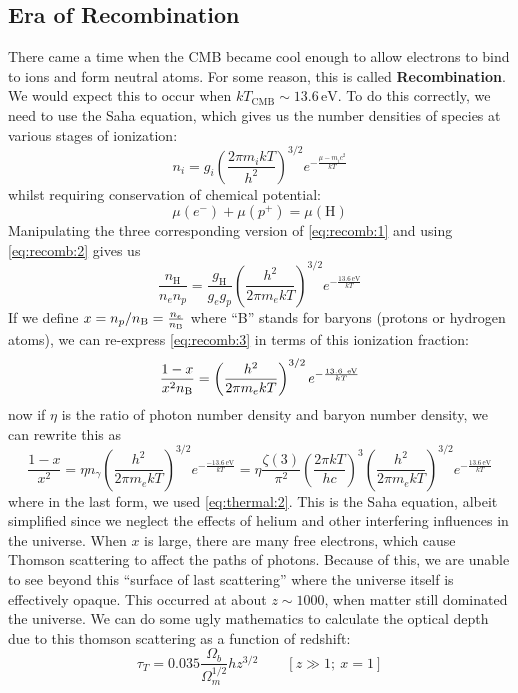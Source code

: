 \documentclass[10pt]{article}
\numberwithin{equation}{section}
\begin{document}
\subsection{Era of Recombination} %
\label{sub:era_of_recombination}
	There came a time when the CMB became cool enough to allow electrons to bind to ions and form neutral atoms. For some reason, this is called \textbf{Recombination}. We would expect this to occur when $kT_{\mathrm{CMB}}\sim 13.6\,\mathrm{eV}$. To do this correctly, we need to use the Saha equation, which gives us the number densities of species at various stages of ionization:
	\begin{equation}
		\label{eq:recomb:1} n_i = g_i \left(\frac{2\pi m_i kT}{h^2}\right)^{3/2}e^{-\frac{\mu -m_i c^2}{kT}}
	\end{equation}
	whilst requiring conservation of chemical potential:
	\begin{equation}
		\label{eq:recomb:2} \mu(e^-) + \mu(p^+) = \mu(\mathrm{H})
	\end{equation}
	Manipulating the three corresponding version of \eqref{eq:recomb:1} and using \eqref{eq:recomb:2} gives us
	\begin{equation}
		\label{eq:recomb:3} \frac{n_{\mathrm{H}}}{n_{e}n_p} = \frac{g_\mathrm{H}}{g_eg_p} \left(\frac{h^2}{2\pi m_ekT}\right)^{3/2} e^{-\frac{13.6\,\mathrm{eV}}{kT}}
	\end{equation}
	If we define $x=n_p/n_{\mathrm{\rm B}} = \frac{n_e}{n_{\rm B}}$ where ``B'' stands for baryons (protons or hydrogen atoms), we can re-express \eqref{eq:recomb:3} in terms of this ionization fraction:
	\begin{equation}
		\label{eq:recomb:4} \frac{1-x}{x^2n_{\rm B}} = \left(\frac{h^2}{2\pi m_e kT}\right)^{3/2}e^{-\frac{13.6\ \mathrm{eV}}{kT}}
	\end{equation}
	now if $\eta$ is the ratio of photon number density and baryon number density, we can rewrite this as
	\begin{equation}
		\label{eq:recomb:5} \frac{1-x}{x^2} = \eta n_\gamma\left(\frac{h^2}{2\pi m_e kT}\right)^{3/2} e^{-\frac{-13.6\,\mathrm{eV}}{kT}} = \eta\frac{\zeta(3)}{\pi^2}\left(\frac{2\pi k T}{hc}\right)^3 \left( \frac{h^2}{2\pi m_e kT}\right)^{3/2} e^{-\frac{13.6\,\mathrm{eV}}{kT}}
	\end{equation}
	where in the last form, we used \eqref{eq:thermal:2}. This is the Saha equation, albeit simplified since we neglect the effects of helium and other interfering influences in the universe. When $x$ is large, there are many free electrons, which cause Thomson scattering to affect the paths of photons. Because of this, we are unable to see beyond this ``surface of last scattering'' where the universe itself is effectively opaque. This occurred at about $z\sim 1000$, when matter still dominated the universe. We can do some ugly mathematics to calculate the optical depth due to this thomson scattering as a function of redshift:
	\begin{equation}
		\label{eq:recomb:6} \tau_T = 0.035\frac{\Omega_b}{\Omega_m^{1/2}}hz^{3/2}\qquad [z\gg 1;\ x=1]
	\end{equation}
\end{document}
